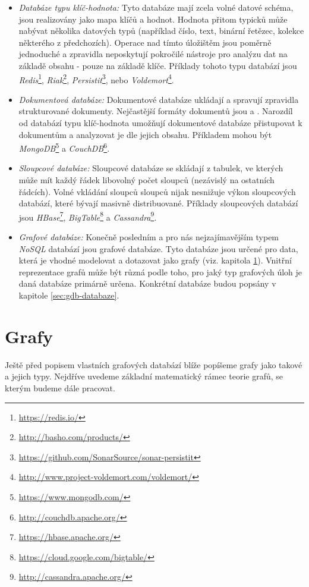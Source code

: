 \begin{itemize}
  \item{\textit{Databáze typu klíč-hodnota:}} Tyto databáze mají zcela volné datové schéma, jsou realizovány jako mapa klíčů a hodnot. Hodnota přitom typicků může nabývat několika datových typů (například číslo, text, binární řetězec, kolekce některého z předchozích). Operace nad tímto úložištěm jsou poměrně jednoduché a zpravidla neposkytují pokročilé nástroje pro analýzu dat na základě obsahu - pouze na základě klíče. Příklady tohoto typu databází jsou \textit{Redis}\footnote{\url{https://redis.io/}}, \textit{Riak}\footnote{\url{http://basho.com/products/}}, \textit{Persistit}\footnote{\url{https://github.com/SonarSource/sonar-persistit}}, nebo \textit{Voldemort}\footnote{\url{http://www.project-voldemort.com/voldemort/}}.
  \item{\textit{Dokumentová databáze:}} Dokumentové databáze ukládají a spravují zpravidla strukturované dokumenty. Nejčastější formáty dokumentů jsou \textit{} a \textit{}. Narozdíl od databází typu klíč-hodnota umožňují dokumentové databáze přistupovat k dokumentům a analyzovat je dle jejich obsahu. Příkladem mohou být \textit{MongoDB}\footnote{\url{https://www.mongodb.com/}} a \textit{CouchDB}\footnote{\url{http://couchdb.apache.org/}}.
  \item{\textit{Sloupcové databáze:}} Sloupcové databáze se skládají z tabulek, ve kterých může mít každý řádek libovolný počet sloupců (nezávislý na ostatních řádcích). Volné vkládání sloupců sloupců nijak nesnižuje výkon sloupcových databází, které bývají masivně distribuované. Příklady sloupcových databází jsou \textit{HBase}\footnote{\url{https://hbase.apache.org/}}, \textit{BigTable}\footnote{\url{https://cloud.google.com/bigtable/}} a \textit{Cassandra}\footnote{\url{http://cassandra.apache.org/}}.
  \item{\textit{Grafové databáze:}} Konečně posledním a pro nás nejzajímavějším typem \textit{NoSQL} databází jsou grafové databáze. Tyto databáze jsou určené pro data, která je vhodné modelovat a dotazovat jako grafy (viz. kapitola \ref{sec:gdb-grafy}). Vnitřní reprezentace grafů může být různá podle toho, pro jaký typ grafových úloh je daná databáze primárně určena. Konkrétní databáze budou popsány v kapitole \ref{sec:gdb-databaze}.
\end{itemize}


\section{Grafy}
\label{sec:gdb-grafy}
Ještě před popisem vlastních grafových databází blíže popíšeme grafy jako takové a jejich typy. Nejdříve uvedeme základní matematický rámec teorie grafů, se kterým budeme dále pracovat.


